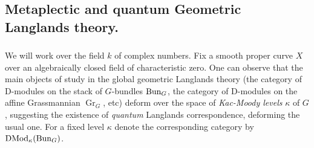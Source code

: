 \documentclass[9pt]{amsart}
\DeclareMathOperator{\Gra}{{Gr}}
\newcommand{\bA}{{\mathbb A}}
\numberwithin{equation}{section}
\DeclareMathOperator{\D}{{DMod}}
\begin{document}

	\subsection{Metaplectic and quantum Geometric Langlands theory.}
	\subsubsection{}  We will work over the field $k$ of complex numbers. Fix a smooth proper curve $X$ over an algebraically closed field of characteristic zero. One can observe that the main objects of study in the global geometric Langlands theory (the category of D-modules on the stack of $G$-bundles $\operatorname{{Bun}}_G$, the category of D-modules on the affine Grassmannian $\Gra_G$, etc) deform over the space of \emph{Kac-Moody levels} $\kappa$ of $G$, suggesting the existence of \emph{quantum} Langlands correspondence, deforming the usual one. For a fixed level $\kappa$ denote the corresponding category by $\D_{\kappa}(\Bun_G)$.
	
\end{document}
